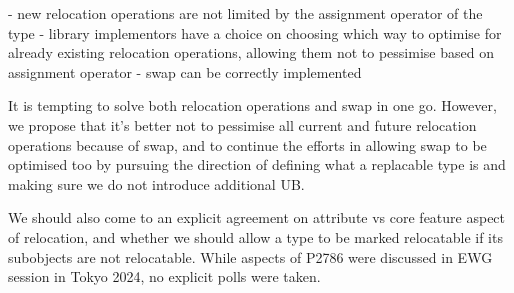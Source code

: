 \documentclass{wg21}
\begin{document}
- new relocation operations are not limited by the assignment operator of the type
- library implementors have a choice on choosing which way to optimise for already existing relocation operations, allowing them not to pessimise based on assignment operator
- swap can be correctly implemented

It is tempting to solve both relocation operations and swap in one go. However, we propose that it's better not to pessimise all current and future relocation operations because of swap, and to continue the efforts in allowing swap to be optimised too by pursuing the direction of defining what a replacable type is and making sure we do not introduce additional UB.

We should also come to an explicit agreement on attribute vs core feature aspect of relocation, and whether we should allow a type to be marked relocatable if its subobjects are not relocatable. While aspects of P2786 were discussed in EWG session in Tokyo 2024, no explicit polls were taken.

\appendix





\renewcommand{\section}[2]{}%

\begin{thebibliography}{9}

\end{thebibliography}
\end{document}
